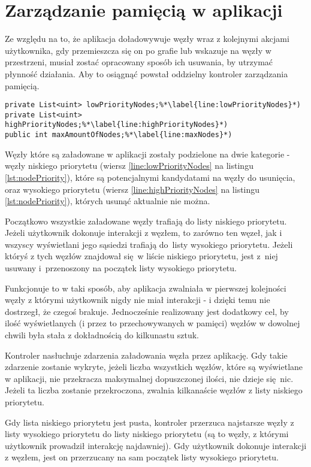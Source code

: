 \section{Zarządzanie pamięcią w aplikacji}
\label{sec:pamiec}
Ze względu na to, że aplikacja doładowywuje węzły wraz z kolejnymi akcjami użytkownika, gdy przemieszcza się on po grafie lub wskazuje na węzły w przestrzeni, musiał zostać opracowany sposób ich usuwania, by utrzymać płynność działania. Aby to osiągnąć powstał oddzielny kontroler zarządzania pamięcią.

\begin{lstlisting}[caption={Pomocnicze struktury i zmienne kontrolera zarządzania pamięcią}, label=lst:nodePriority]
private List<uint> lowPriorityNodes;%*\label{line:lowPriorityNodes}*)
private List<uint> highPriorityNodes;%*\label{line:highPriorityNodes}*)
public int maxAmountOfNodes;%*\label{line:maxNodes}*)
\end{lstlisting}

Węzły które są załadowane w aplikacji zostały podzielone na dwie kategorie - węzły niskiego priorytetu (wiersz \ref{line:lowPriorityNodes} na listingu \ref{lst:nodePriority}), które są potencjalnymi kandydatami na węzły do usunięcia, oraz wysokiego priorytetu (wiersz \ref{line:highPriorityNodes} na listingu \ref{lst:nodePriority}), których usunąć aktualnie nie można.

Początkowo wszystkie załadowane węzły trafiają do listy niskiego priorytetu. Jeżeli użytkownik dokonuje interakcji z węzłem, to zarówno ten węzeł, jak i wszyscy wyświetlani jego sąsiedzi trafiają do~listy wysokiego priorytetu. Jeżeli któryś z tych węzłów znajdował się w liście niskiego priorytetu, jest z~niej usuwany i~przenoszony na początek listy wysokiego priorytetu.

Funkcjonuje to w taki sposób, aby aplikacja zwalniała w pierwszej kolejności węzły z którymi użytkownik nigdy nie miał interakcji - i dzięki temu nie dostrzegł, że czegoś brakuje. Jednocześnie realizowany jest dodatkowy cel, by ilość wyświetlanych (i przez to przechowywanych w pamięci) węzłów w dowolnej chwili była stała z dokładnością do kilkunastu sztuk.

Kontroler nasłuchuje zdarzenia załadowania węzła przez aplikację. Gdy takie zdarzenie zostanie wykryte, jeżeli liczba wszystkich węzłów, które są wyświetlane w aplikacji, nie przekracza maksymalnej dopuszczonej ilości, nie dzieje się nic. Jeżeli ta liczba zostanie przekroczona, zwalnia kilkanaście węzłów z listy niskiego priorytetu.

Gdy lista niskiego priorytetu jest pusta, kontroler przerzuca najstarsze węzły z listy wysokiego priorytetu do listy niskiego priorytetu (są to węzły, z którymi użytkownik prowadził interakcję najdawniej). Gdy użytkownik dokonuje interakcji z węzłem, jest on przerzucany na sam początek listy wysokiego priorytetu.